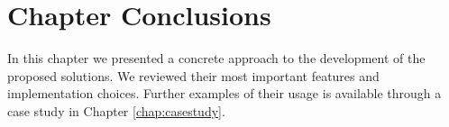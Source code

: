 

\section{Chapter Conclusions}


In this chapter we presented a concrete approach to the development of the
proposed solutions. We reviewed their most important features and implementation
choices. Further examples of their usage is available through a case study in
Chapter \ref{chap:casestudy}.
